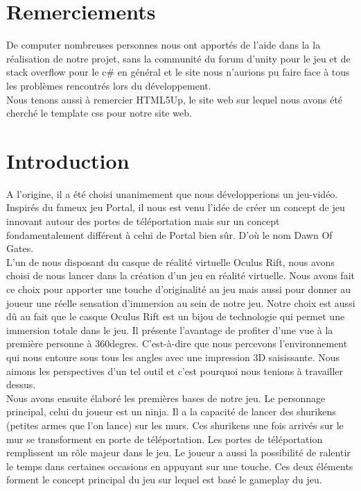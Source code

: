 \documentclass[12pt]{article}
\begin{document}
\newpage

\section*{Remerciements}

De \gls{computer} nombreuses personnes nous ont apportés de l'aide dans la la réalisation de notre projet, sans la communité du forum d'unity pour le jeu et de stack overflow pour le c\# en général et le site nous n'aurions pu faire face à tous les problèmes rencontrés lors du développement.\\
Nous tenons aussi à remercier HTML5Up, le site web sur lequel nous avons été cherché le template css pour notre site web.

\newpage

\section*{Introduction}

A l'origine, il a été choisi unanimement que nous développerions un jeu-vidéo. Inspirés du fameux jeu Portal, il nous est venu l'idée de créer un concept de jeu innovant autour des portes de téléportation mais sur un concept fondamentalement différent à celui de Portal bien sûr. D'où le nom Dawn Of Gates.\\
L'un de nous disposant du casque de réalité virtuelle Oculus Rift, nous avons choisi de nous lancer dans la création d'un jeu en réalité virtuelle. Nous avons fait ce choix pour apporter une touche d'originalité au jeu mais aussi pour donner au joueur une réelle sensation d'immersion au sein de notre jeu. Notre choix est aussi dû au fait que le casque Oculus Rift est un bijou de technologie qui permet une immersion totale dans le jeu. Il présente l'avantage de profiter d'une vue à la première personne à 360degres. C'est-à-dire que nous percevons l'environnement qui nous entoure sous tous les angles avec une impression 3D saisissante. Nous aimons les perspectives d'un tel outil et c'est pourquoi nous tenions à travailler dessus.\\
Nous avons ensuite élaboré les premières bases de notre jeu. Le personnage principal, celui du joueur est un ninja. Il a la capacité de lancer des shurikens (petites armes que l'on lance) sur les murs. Ces shurikens une fois arrivés sur le mur se transforment en porte de téléportation. Les portes de téléportation remplissent un rôle majeur dans le jeu. Le joueur a aussi la possibilité de ralentir le temps dans certaines occasions en appuyant sur une touche. Ces deux éléments forment le concept principal du jeu sur lequel est basé le gameplay du jeu.\\
\end{document}
